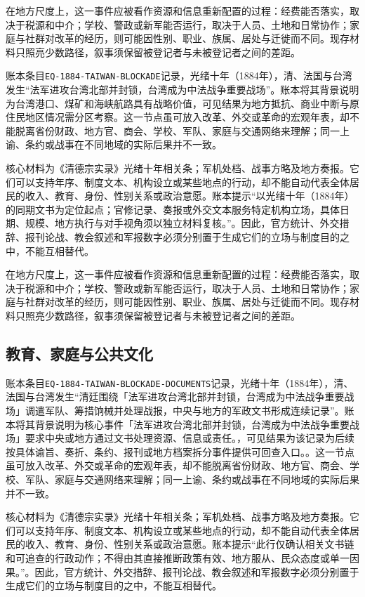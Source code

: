 在地方尺度上，这一事件应被看作资源和信息重新配置的过程：经费能否落实，取决于税源和中介；学校、警政或新军能否运行，取决于人员、土地和日常协作；家庭与社群对改革的经历，则可能因性别、职业、族属、居处与迁徙而不同。现存材料只照亮少数路径，叙事须保留被登记者与未被登记者之间的差距。

账本条目\texttt{EQ-1884-TAIWAN-BLOCKADE}记录，光绪十年（1884年），清、法国与台湾发生“法军进攻台湾北部并封锁，台湾成为中法战争重要战场”。账本将其背景说明为台湾港口、煤矿和海峡航路具有战略价值，可见结果为地方抵抗、商业中断与原住民地区情况需分区考察。这一节点虽可放入改革、外交或革命的宏观年表，却不能脱离省份财政、地方官、商会、学校、军队、家庭与交通网络来理解；同一上谕、条约或战事在不同地域的实际后果并不一致。

核心材料为《清德宗实录》光绪十年相关条；军机处档、战事方略及地方奏报。它们可以支持年序、制度文本、机构设立或某些地点的行动，却不能自动代表全体居民的收入、教育、身份、性别关系或政治意愿。账本提示“以光绪十年（1884年）的同期文书为定位起点；官修记录、奏报或外交文本服务特定机构立场，具体日期、规模、地方执行与对手视角须以独立材料复核。”。因此，官方统计、外交措辞、报刊论战、教会叙述和军报数字必须分别置于生成它们的立场与制度目的之中，不能互相替代。

在地方尺度上，这一事件应被看作资源和信息重新配置的过程：经费能否落实，取决于税源和中介；学校、警政或新军能否运行，取决于人员、土地和日常协作；家庭与社群对改革的经历，则可能因性别、职业、族属、居处与迁徙而不同。现存材料只照亮少数路径，叙事须保留被登记者与未被登记者之间的差距。

\subsection{教育、家庭与公共文化}

账本条目\texttt{EQ-1884-TAIWAN-BLOCKADE-DOCUMENTS}记录，光绪十年（1884年），清、法国与台湾发生“清廷围绕「法军进攻台湾北部并封锁，台湾成为中法战争重要战场」调遣军队、筹措饷械并处理战报，中央与地方的军政文书形成连续记录”。账本将其背景说明为核心事件「法军进攻台湾北部并封锁，台湾成为中法战争重要战场」要求中央或地方通过文书处理资源、信息或责任。，可见结果为该记录为后续按具体谕旨、奏折、条约、报刊或地方档案拆分事件提供可回查入口。。这一节点虽可放入改革、外交或革命的宏观年表，却不能脱离省份财政、地方官、商会、学校、军队、家庭与交通网络来理解；同一上谕、条约或战事在不同地域的实际后果并不一致。

核心材料为《清德宗实录》光绪十年相关条；军机处档、战事方略及地方奏报。它们可以支持年序、制度文本、机构设立或某些地点的行动，却不能自动代表全体居民的收入、教育、身份、性别关系或政治意愿。账本提示“此行仅确认相关文书链和可追查的行政动作；不得由其直接推断政策有效、地方服从、民众态度或单一因果。”。因此，官方统计、外交措辞、报刊论战、教会叙述和军报数字必须分别置于生成它们的立场与制度目的之中，不能互相替代。

